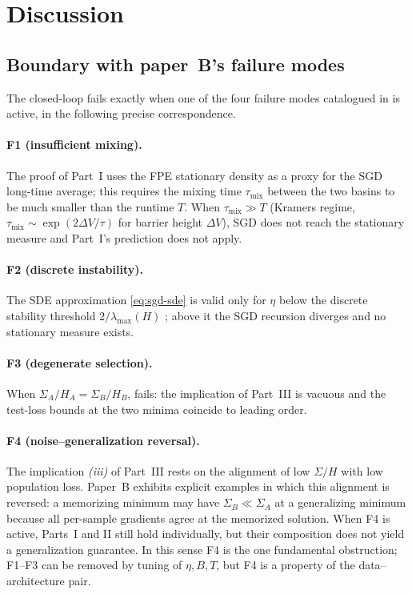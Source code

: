 \documentclass[11pt,a4paper]{article}
\theoremstyle{definition}
\theoremstyle{remark}
\begin{document}
\section{Discussion}\label{sec:discussion}

\subsection{Boundary with paper~B's failure modes}

The closed-loop  fails exactly when one of the four
failure modes catalogued in \cite{paperB} is active, in the following
precise correspondence.

\paragraph{F1 (insufficient mixing).}
The proof of Part~I uses the FPE stationary density as a proxy for the
SGD long-time average; this requires the mixing time $\tau_{\mathrm{mix}}$
between the two basins to be much smaller than the runtime $T$.
When $\tau_{\mathrm{mix}} \gg T$ (Kramers regime,
$\tau_{\mathrm{mix}}\sim \exp(2\Delta V/\tau)$ for barrier height
$\Delta V$), SGD does not reach the stationary measure and Part~I's
prediction does not apply.

\paragraph{F2 (discrete instability).}
The SDE approximation \eqref{eq:sgd-sde} is valid only for $\eta$ below
the discrete stability threshold $2/\lambda_{\max}(H)$ \cite{LiTaiE2017};
above it the SGD recursion diverges and no stationary measure exists.

\paragraph{F3 (degenerate selection).}
When $\Sigma_A/H_A = \Sigma_B/H_B$,  fails: the implication of
Part~III is vacuous and the test-loss bounds at the two minima coincide
to leading order.

\paragraph{F4 (noise--generalization reversal).}
The implication \emph{(iii)} of Part~III rests on the alignment of low
$\Sigma/H$ with low population loss.  Paper~B exhibits explicit examples
in which this alignment is reversed: a memorizing minimum may have
$\Sigma_B \ll \Sigma_A$ at a generalizing minimum because all per-sample
gradients agree at the memorized solution.  When F4 is active,
 Parts~I and II still hold individually, but their
composition does not yield a generalization guarantee.  In this sense F4
is the one fundamental obstruction; F1--F3 can be removed by tuning of
$\eta,B,T$, but F4 is a property of the data--architecture pair.
\end{document}
